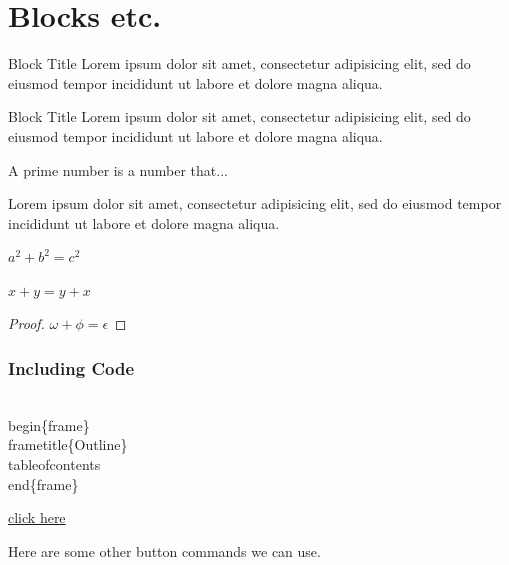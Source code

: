 \documentclass[14pt]{beamer}
\begin{document}
\section{Blocks etc.}

\begin{frame}
\begin{block}{Block Title}
	Lorem ipsum dolor sit amet, consectetur adipisicing elit, sed do eiusmod tempor incididunt ut labore et dolore magna aliqua.
\end{block}

\begin{alertblock}{Block Title}
	Lorem ipsum dolor sit amet, consectetur adipisicing elit, sed do eiusmod tempor incididunt ut labore et dolore magna aliqua.
\end{alertblock}

\begin{definition}
	A prime number is a number that...
\end{definition}

\begin{example}
	Lorem ipsum dolor sit amet, consectetur adipisicing elit, sed do eiusmod tempor incididunt ut labore et dolore magna aliqua.
\end{example}
\end{frame}

\begin{frame}
\begin{theorem}[Pythagoras]
	$ a^2 + b^2 = c^2$
\end{theorem}
\begin{corollary}
	$ x + y = y + x  $
\end{corollary}
\begin{proof}
	$\omega +\phi = \epsilon $
\end{proof}
\end{frame}

\begin{frame}[fragile]
\frametitle{Including Code}
\begin{semiverbatim}
	\\begin\{frame\}
	\\frametitle\{Outline\}
	\\tableofcontents
	\\end\{frame\}
\end{semiverbatim}
\end{frame}

\begin{frame}
\label{contents}
\hyperlink{contents}{click here}

\hyperlink{contents}{}

Here are some other button commands we can use.

\hyperlink{columns}{}

\hyperlink{pictures}{}

\hyperlink{pictures}{}


\end{frame}
\end{document}
